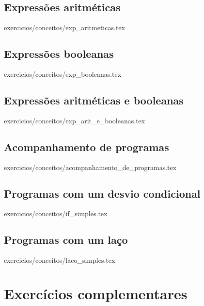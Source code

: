 \begin{enumerate}

\subsection{Expressões aritméticas}
 {exercicios/conceitos/exp_aritmeticas.tex}

\subsection{Expressões booleanas}
 {exercicios/conceitos/exp_booleanas.tex}

\subsection{Expressões aritméticas e booleanas}
 {exercicios/conceitos/exp_arit_e_booleanas.tex}

\subsection{Acompanhamento de programas}
 {exercicios/conceitos/acompanhamento_de_programas.tex}

\subsection{Programas com um desvio condicional}
 {exercicios/conceitos/if_simples.tex}

\subsection{Programas com um laço}
 {exercicios/conceitos/laco_simples.tex}
\end{enumerate}

\newpage

\section{Exercícios complementares}

